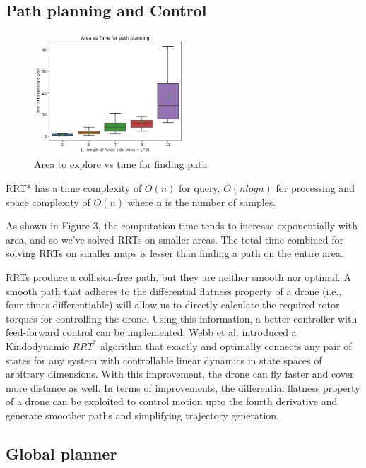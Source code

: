 \subsection{Path planning and Control}

\begin{figure}[h]
\centering
\includegraphics[width=0.5\textwidth]{images/time_area.png}
\caption{Area to explore vs time for finding path}
\end{figure}


RRT* has a time complexity of $O(n)$ for query, $O(nlogn)$ for processing and space complexity of $O(n)$ where n is the number of samples.

As shown in Figure 3, the computation time tends to increase exponentially with area, and so we've solved RRTs on smaller areas.
The total time combined for solving RRTs on smaller maps is lesser than finding a path on the entire area.

RRTs produce a collision-free path, but they are neither smooth nor optimal.
A smooth path that adheres to the differential flatness property of a drone (i.e., four times differentiable) will allow us to directly calculate the required rotor torques for controlling the drone.
Using this information, a better controller with feed-forward control can be implemented.
Webb et al. introduced a Kindodynamic $RRT^*$ algorithm that exactly and optimally connects any pair of states for any system with controllable linear dynamics in state spaces of arbitrary dimensions\cite{DBLP:journals/corr/abs-1205-5088}.
With this improvement, the drone can fly faster and cover more distance as well.
In terms of improvements, the differential flatness property of a drone can be exploited to control motion upto the fourth derivative and generate smoother paths and simplifying trajectory generation.

 
\subsection{Global planner}

